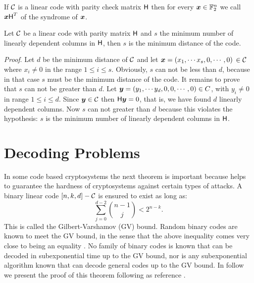 {
     If $\mathcal{C}$ is a linear code with parity check matrix $\normalfont\textsf{H}$ then for every $\boldsymbol{x}\in\mathbb{F}_2^n$ we call $\boldsymbol{x}\normalfont\textsf{H}^T$ of the syndrome of $\boldsymbol{x}$. 
}


{
    Let $\mathcal{C}$ be a linear code with parity matrix $\normalfont\textsf{H}$ and $s$ the minimum number of linearly dependent columns in $ \normalfont\textsf{H} $, then $s$ is the minimum distance of the code.
}

\textit{Proof}. Let $d$ be the minimum distance of $\mathcal{C}$ and let $\boldsymbol{x}= (x_1, \cdots x_s, 0, \cdots, 0)$ $\in \mathcal{C}$ where $x_i \neq 0 $ in the range $1 \leq i \leq s$. Obviously, $s$ can not be less than $d$, because in that case $s$ must be the minimum distance of the code. It remains to prove that $s$ can not be greater than $d$. Let $\boldsymbol{y} = (y_1, \cdots y_d, 0,0, \cdots, 0) \in C$, with $y_i \neq 0$ in range $ 1 \leq i \leq d$. Since $\boldsymbol{y} \in \mathcal{C}$ then $\normalfont\textsf{H}\boldsymbol{y}=0$, that is, we have found $d$ linearly dependent columns. Now $s$ can not greater than $d$ because this violates the hypothesis: $s$ is the minimum number of linearly dependent columns in $ \normalfont\textsf{H}$.

\section{Decoding Problems}
In some code based cryptosystems the next theorem is important because helps to guarantee the hardness of cryptosystems against certain types of attacks.
{
    A binary linear code $[n,k,d]-\mathcal{C}$ is ensured to exist as long as:
\[
  \sum_{j=0}^{d-2}\binom{n-1}{j}<2^{n-k}.
\]
}
This is called the Gilbert-Varshamov (GV) bound. Random binary codes are known to meet the GV bound, in the sense that the above inequality comes very close to being an equality \cite{book:MacWilliams:Sloane}. No family of binary codes is known that can be decoded in subexponential time up to the GV bound, nor is any subexponential algorithm known that can decode general codes
up to the GV bound. In follow we present the proof of this theorem following as reference \cite{book:MacWilliams:Sloane}.




